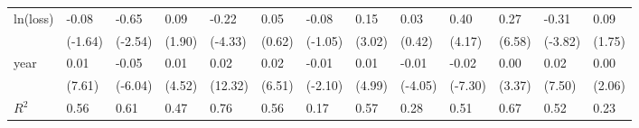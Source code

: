 \begin{tabular}{p{1.5cm} p{1.7cm} p{1.7cm} p{1.7cm}  p{1.7cm} p{1.7cm} p{1.7cm} p{1.7cm} p{1.7cm}  p{1.7cm} p{1.7cm} p{1.7cm} p{1.7cm} }
\hline
ln(loss)        &    -0.08         &    -0.65\sym{*}  &     0.09         &    -0.22\sym{***}&     0.05         &    -0.08         &     0.15\sym{**} &     0.03         &     0.40\sym{***}&     0.27\sym{***}&    -0.31\sym{***}&     0.09         \\
                &  (-1.64)         &  (-2.54)         &   (1.90)         &  (-4.33)         &   (0.62)         &  (-1.05)         &   (3.02)         &   (0.42)         &   (4.17)         &   (6.58)         &  (-3.82)         &   (1.75)         \\
year            &     0.01\sym{***}&    -0.05\sym{***}&     0.01\sym{***}&     0.02\sym{***}&     0.02\sym{***}&    -0.01\sym{*}  &     0.01\sym{***}&    -0.01\sym{***}&    -0.02\sym{***}&     0.00\sym{**} &     0.02\sym{***}&     0.00\sym{*}  \\
                &   (7.61)         &  (-6.04)         &   (4.52)         &  (12.32)         &   (6.51)         &  (-2.10)         &   (4.99)         &  (-4.05)         &  (-7.30)         &   (3.37)         &   (7.50)         &   (2.06)         \\
\hline
\(R^{2}\)       &     0.56         &     0.61         &     0.47         &     0.76         &     0.56         &     0.17         &     0.57         &     0.28         &     0.51         &     0.67         &     0.52         &     0.23         \\
\end{tabular}
\def\sym#1{\ifmmode^{#1}\else\(^{#1}\)\fi}
